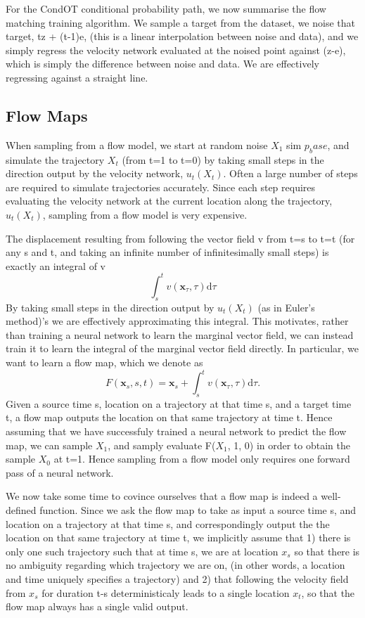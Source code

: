 \documentclass[12pt,a4paper]{report}
\begin{document}
For the CondOT conditional probability path, we now summarise the flow matching training algorithm. 
We sample a target from the dataset, we noise that target, tz + (t-1)e, (this is a linear interpolation between noise and data), and we simply regress the velocity network evaluated at the noised point against (z-e), which is simply the difference between noise and data. We are effectively regressing against a straight line. 

\subsection{Flow Maps}
When sampling from a flow model, we start at random noise $X_1$ sim $p_base$, and simulate the trajectory $X_t$ (from t=1 to t=0) by taking small steps in the direction output by the velocity network, $u_t(X_t)$.
Often a large number of steps are required to simulate trajectories accurately. 
Since each step requires evaluating the velocity network at the current location along the trajectory, $u_t(X_t)$, sampling from a flow model is very expensive. 

The displacement resulting from following the vector field v from t=s to t=t (for any s and t, and taking an infinite number of infinitesimally small steps) is exactly an integral of v
$$\int_s^t v(\mathbf{x}_\tau, \tau) \mathrm{d}\tau$$
By taking small steps in the direction output by $u_t(X_t)$ (as in Euler's method)'s we are effectively approximating this integral. 
This motivates, rather than training a neural network to learn the marginal vector field, we can instead train it to learn the integral of the marginal vector field directly. In particular, we want to learn a flow map, which we denote as 
        \begin{equation}
        \label{eq:flow_integral}
        F(\mathbf{x}_s, s, t) = \mathbf{x}_s + \int_s^t v(\mathbf{x}_\tau, \tau) \mathrm{d}\tau.
        \end{equation}
Given a source time s, location on a trajectory at that time s, and a target time t, a flow map outputs the location on that same trajectory at time t. 
Hence assuming that we have successfuly trained a neural network to predict the flow map, we can sample $X_1$, and samply evaluate F($X_1$, 1, 0) in order to obtain the sample $X_0$ at t=1. Hence sampling from a flow model only requires one forward pass of a neural network. 

We now take some time to covince ourselves that a flow map is indeed a well-defined function.  
Since we ask the flow map to take as input a source time s, and location on a trajectory at that time s, and correspondingly output the the location on that same trajectory at time t, we implicitly assume that 1) there is only one such trajectory such that at time s, we are at location $x_s$ so that there is no ambiguity regarding which trajectory we are on, (in other words, a location and time uniquely specifies a trajectory) and 2) that following the velocity field from $x_s$ for duration t-s deterministicaly leads to a single location $x_t$, so that the flow map always has a single valid output. 
\end{document}
